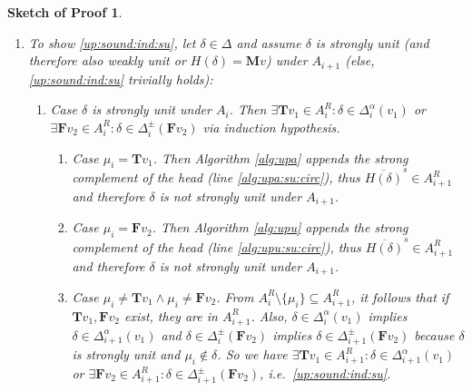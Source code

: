 \documentclass{vutinfth} %
\newtheorem{proof-sketch}{Sketch of Proof}[chapter]
\newcommand{\negstrong}[1]{\overline{#1}^s}
\newcommand{\ass}{A}
\newcommand{\bT}{\mathbf{T}}
\newcommand{\bM}{\mathbf{M}}
\newcommand{\bF}{\mathbf{F}}
\newcommand{\contradiction}{\Lightning}
\newcommand{\dpm}{\Delta^\pm}
\newcommand{\dal}{\Delta^\alpha}
\newcommand{\headf}{H}
\newcommand{\sgl}{\mu}
\begin{document}
\begin{proof-sketch}
\begin{enumerate}
\item To show \ref{up:sound:ind:su}, let $\delta \in \Delta$ and assume $\delta$ is strongly unit (and therefore also weakly unit or $\headf(\delta) = \bM v$) under $\ass_{i+1}$ (else, \ref{up:sound:ind:su} trivially holds):
\begin{enumerate}
	\item Case $\delta$ is strongly unit under $\ass_i$. Then $\exists {\bT v_1} \in \ass_i^R : \delta \in \dal_i(v_1)$ or $\exists {\bF v_2} \in \ass_i^R : \delta \in \dpm_i({\bF v_2})$ via induction hypothesis.
	\begin{enumerate}
		\item Case $\sgl_i = {\bT v_1}$. Then Algorithm \ref{alg:upa} appends the strong complement of the head (line \ref{alg:upa:su:circ}), thus $\negstrong{\headf(\delta)} \in A_{i+1}^R$ and therefore $\delta$ is not strongly unit under $A_{i+1}$. \contradiction
		\item Case $\sgl_i = {\bF v_2}$. Then Algorithm \ref{alg:upu} appends the strong complement of the head (line \ref{alg:upu:su:circ}), thus $\negstrong{\headf(\delta)} \in A_{i+1}^R$ and therefore $\delta$ is not strongly unit under $A_{i+1}$. \contradiction
		\item Case $\sgl_i \not = {\bT v_1} \wedge \sgl_i \not = {\bF v_2}$.
		From $\ass_{i}^R \setminus \{ \sgl_i \} \subseteq \ass_{i+1}^R$, it follows that if ${\bT v_1}, {\bF v_2}$ exist, they are in $\ass_{i+1}^R$. Also, $\delta \in \dal_i(v_1)$ implies $\delta \in \dal_{i+1}(v_1)$ and $\delta \in \dpm_i({\bF v_2})$ implies $\delta \in \dpm_{i+1}({\bF v_2})$ because $\delta$ is strongly unit and $\sgl_i \not \in \delta$. So we have $\exists {\bT v_1} \in \ass_{i+1}^R : \delta \in \dal_{i+1}(v_1)$ or $\exists {\bF v_2} \in \ass_{i+1}^R : \delta \in \dpm_{i+1}({\bF v_2})$, i.e.~\ref{up:sound:ind:su}. %
	\end{enumerate}
	

\end{enumerate}
\end{enumerate}
\end{proof-sketch}
\end{document}
